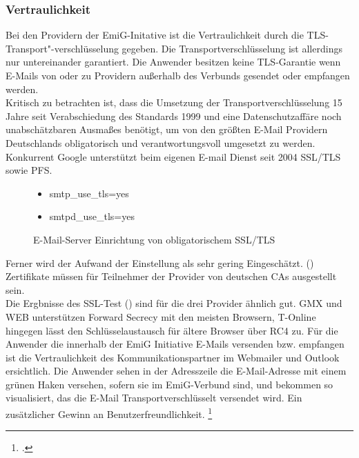 \documentclass  [paper=a4,
				fontsize=12pt,
				listof=totoc,
				bibliography=totoc
				]{scrreprt}
\begin{document}
		\subsubsection{Vertraulichkeit}		
			Bei den Providern der EmiG-Initative ist die Vertraulichkeit durch die TLS-Transport"-verschlüsselung gegeben. 
			Die Transportverschlüsselung ist allerdings nur untereinander garantiert. 
			Die Anwender besitzen keine TLS-Garantie wenn E-Mails von oder zu Providern außerhalb des Verbunds gesendet oder empfangen werden.\\
			Kritisch zu betrachten ist, dass die Umsetzung der Transportverschlüsselung 15 Jahre seit Verabschiedung des Standards 1999 und eine Datenschutzaffäre noch unabschätzbaren Ausmaßes benötigt, um von den größten E-Mail Providern Deutschlands obligatorisch und verantwortungsvoll umgesetzt zu werden. 
			Konkurrent Google unterstützt beim eigenen E-mail Dienst seit 2004 SSL/TLS sowie PFS.
			
			\begin{figure} %
				\vspace{-24pt}
				\centering
				\begin{itemize}
					\renewcommand{\labelitemi}{$\Rightarrow$}
					\item smtp\_use\_tls=yes
					\item smtpd\_use\_tls=yes
				\end{itemize}
				\caption[EmiG: SSL/TLS wurde aktiviert]{E-Mail-Server Einrichtung von obligatorischem SSL/TLS\footnotemark}
				\label{fig:emig_tls} %
				\vspace{-12pt}
			\end{figure}
			Ferner wird der Aufwand der Einstellung als sehr gering Eingeschätzt. ()\\
			Zertifikate müssen für Teilnehmer der Provider von deutschen \acp{CA} ausgestellt sein.\medskip\\
			Die Ergbnisse des SSL-Test () sind für die drei Provider ähnlich gut. GMX und WEB unterstützen Forward Secrecy mit den meisten Browsern, T-Online hingegen lässt den Schlüsselaustausch für ältere Browser über RC4 zu.
			Für die Anwender die innerhalb der EmiG Initiative E-Mails versenden bzw. empfangen ist die Vertraulichkeit des Kommunikationspartner im Webmailer und Outlook ersichtlich.
			Die Anwender sehen in der Adresszeile die E-Mail-Adresse mit einem grünen Haken versehen, sofern sie im EmiG-Verbund sind, und bekommen so visualisiert, das die E-Mail Transportverschlüsselt versendet wird. Ein zusätzlicher Gewinn an Benutzerfreundlichkeit.
			\footcite[Vgl.][]{Zivadino14-1}
\end{document}
